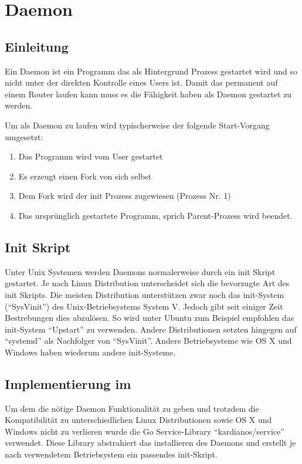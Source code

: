 \section{Daemon}
\label{sec:Daemon}

\subsection{Einleitung}
Ein Daemon ist ein Programm das als Hintergrund Prozess gestartet wird und so nicht unter der direkten Kontrolle eines Users ist. Damit das \tool permanent auf einem Router laufen kann muss es die Fähigkeit haben als Daemon gestartet zu werden.

Um als Daemon zu laufen wird typischerweise der folgende Start-Vorgang umgesetzt:

\begin{enumerate}
  \item Das Programm wird vom User gestartet
  \item Es erzeugt einen Fork von sich selbst
  \item Dem Fork wird der init Prozess zugewiesen (Prozess Nr. 1)
  \item Das ursprünglich gestartete Programm, sprich Parent-Prozess wird beendet.
\end{enumerate}

\subsection{Init Skript}
Unter Unix Systemen werden Daemons normalerweise durch ein init Skript gestartet. Je nach Linux Distribution unterscheidet sich die bevorzugte Art des init Skripts. Die meisten Distribution unterstützen zwar noch das init-System (\enquote{SysVinit}) des Unix-Betriebsystems System V. Jedoch gibt seit einiger Zeit Bestrebungen dies abzulösen. So wird unter Ubuntu zum Beispiel empfohlen das init-System \enquote{Upstart} zu verwenden. Andere Distributionen setzten hingegen auf \enquote{systemd} als Nachfolger von \enquote{SysVinit}.
Andere Betriebsysteme wie OS X und Windows haben wiederum andere init-Systeme.

\subsection{Implementierung im \tool}
Um dem \tool die nötige Daemon Funktionalität zu geben und trotzdem die Kompatibilität zu unterschiedlichen Linux Distributionen sowie OS X und Windows nicht zu verlieren wurde die Go Service-Library \enquote{kardianos/service} verwendet. Diese Library abstrahiert das installieren des Daemons und erstellt je nach verwendetem Betriebsystem ein passendes init-Skript.

